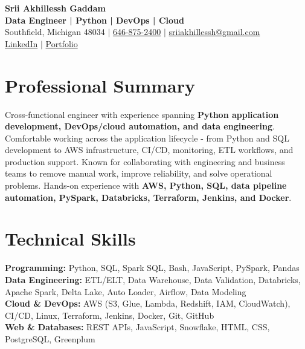 \documentclass[letterpaper,10pt]{article}
\begin{document}
\fontsize{9.35pt}{10.45pt}\selectfont

\begin{center}
    {\LARGE \textbf{Srii Akhillessh Gaddam}} \\[-1pt]
    \textbf{Data Engineer | Python | DevOps | Cloud} \\[2pt]
    Southfield, Michigan 48034 $|$
    \href{tel:6468752400}{646-875-2400} $|$
    \href{mailto:sriiakhillessh@gmail.com}{sriiakhillessh@gmail.com} \\[1pt]
    \href{https://www.linkedin.com/in/srii-akhiilessh-gaddam-b48668191/}{LinkedIn} $|$
    \href{https://sriiakhillesshg.github.io/portfolio/}{Portfolio}
\end{center}
\vspace{-8pt}

\section{Professional Summary}
\small{Cross-functional engineer with experience spanning \textbf{Python application development, DevOps/cloud automation, and data engineering}. Comfortable working across the application lifecycle - from Python and SQL development to AWS infrastructure, CI/CD, monitoring, ETL workflows, and production support. Known for collaborating with engineering and business teams to remove manual work, improve reliability, and solve operational problems. Hands-on experience with \textbf{AWS, Python, SQL, data pipeline automation, PySpark, Databricks, Terraform, Jenkins, and Docker}.}

\section{Technical Skills}
\small{
\textbf{Programming:} Python, SQL, Spark SQL, Bash, JavaScript, PySpark, Pandas \\
\textbf{Data Engineering:} ETL/ELT, Data Warehouse, Data Validation, Databricks, Apache Spark, Delta Lake, Auto Loader, Airflow, Data Modeling \\
\textbf{Cloud \& DevOps:} AWS (S3, Glue, Lambda, Redshift, IAM, CloudWatch), CI/CD, Linux, Terraform, Jenkins, Docker, Git, GitHub \\
\textbf{Web \& Databases:} REST APIs, JavaScript, Snowflake, HTML, CSS, PostgreSQL, Greenplum
}
\end{document}
